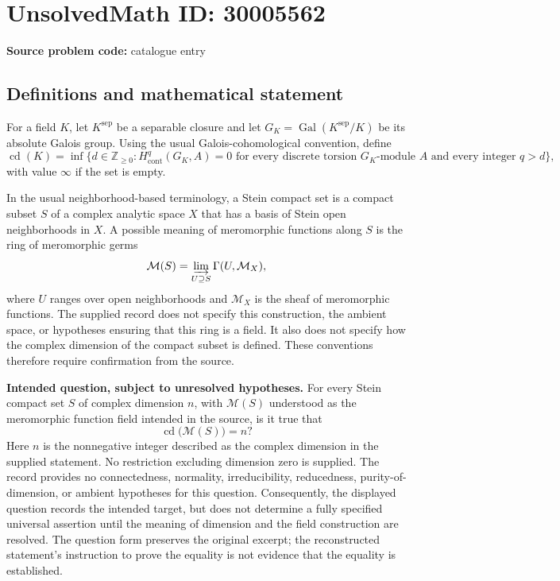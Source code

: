 \documentclass[11pt]{article}
\newcommand{\Z}{\mathbb{Z}}
\begin{document}
\section*{UnsolvedMath ID: 30005562}
\textbf{Source problem code:} catalogue entry
\subsection{Definitions and mathematical statement}
For a field \(K\), let \(K^{\mathrm{sep}}\) be a separable closure and let \(G_K=\operatorname{Gal}(K^{\mathrm{sep}}/K)\) be its absolute Galois group. Using the usual Galois-cohomological convention, define
\[
\operatorname{cd}(K)=\inf\bigl\{d\in\Z_{\geq0}:H^q_{\mathrm{cont}}(G_K,A)=0\text{ for every discrete torsion }G_K\text{-module }A\text{ and every integer }q>d\bigr\},
\]
with value \(\infty\) if the set is empty.

In the usual neighborhood-based terminology, a Stein compact set is a compact subset \(S\) of a complex analytic space \(X\) that has a basis of Stein open neighborhoods in \(X\). A possible meaning of meromorphic functions along \(S\) is the ring of meromorphic germs
\[
\mathcal M(S)=\varinjlim_{U\supseteq S}\Gamma(U,\mathcal M_X),
\]
where \(U\) ranges over open neighborhoods and \(\mathcal M_X\) is the sheaf of meromorphic functions. The supplied record does not specify this construction, the ambient space, or hypotheses ensuring that this ring is a field. It also does not specify how the complex dimension of the compact subset is defined. These conventions therefore require confirmation from the source.

\textbf{Intended question, subject to unresolved hypotheses.} For every Stein compact set \(S\) of complex dimension \(n\), with \(\mathcal M(S)\) understood as the meromorphic function field intended in the source, is it true that
\[
\operatorname{cd}\bigl(\mathcal M(S)\bigr)=n?
\]
Here \(n\) is the nonnegative integer described as the complex dimension in the supplied statement. No restriction excluding dimension zero is supplied. The record provides no connectedness, normality, irreducibility, reducedness, purity-of-dimension, or ambient hypotheses for this question. Consequently, the displayed question records the intended target, but does not determine a fully specified universal assertion until the meaning of dimension and the field construction are resolved. The question form preserves the original excerpt; the reconstructed statement's instruction to prove the equality is not evidence that the equality is established.
\end{document}
